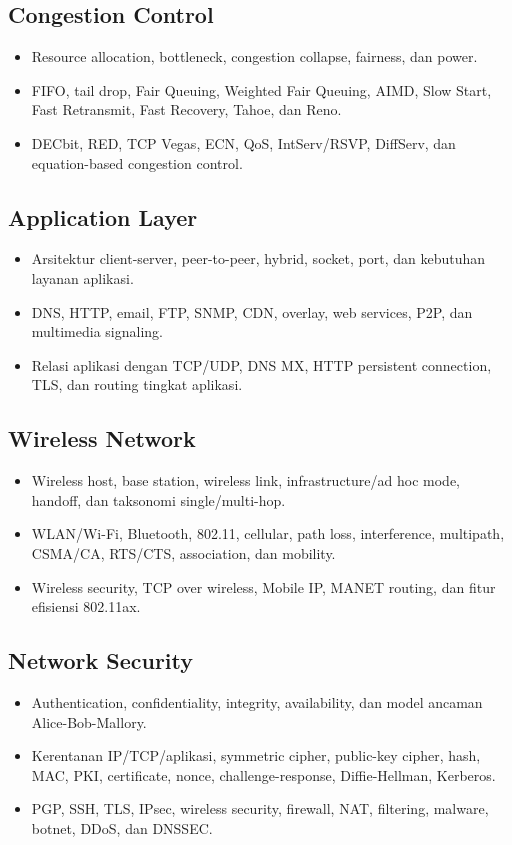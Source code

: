 \documentclass[11pt,a4paper]{article}
\begin{document}
\subsection{Congestion Control}
\begin{itemize}
    \item Resource allocation, bottleneck, congestion collapse, fairness, dan power.
    \item FIFO, tail drop, Fair Queuing, Weighted Fair Queuing, AIMD, Slow Start, Fast Retransmit, Fast Recovery, Tahoe, dan Reno.
    \item DECbit, RED, TCP Vegas, ECN, QoS, IntServ/RSVP, DiffServ, dan equation-based congestion control.
\end{itemize}

\subsection{Application Layer}
\begin{itemize}
    \item Arsitektur client-server, peer-to-peer, hybrid, socket, port, dan kebutuhan layanan aplikasi.
    \item DNS, HTTP, email, FTP, SNMP, CDN, overlay, web services, P2P, dan multimedia signaling.
    \item Relasi aplikasi dengan TCP/UDP, DNS MX, HTTP persistent connection, TLS, dan routing tingkat aplikasi.
\end{itemize}

\subsection{Wireless Network}
\begin{itemize}
    \item Wireless host, base station, wireless link, infrastructure/ad hoc mode, handoff, dan taksonomi single/multi-hop.
    \item WLAN/Wi-Fi, Bluetooth, 802.11, cellular, path loss, interference, multipath, CSMA/CA, RTS/CTS, association, dan mobility.
    \item Wireless security, TCP over wireless, Mobile IP, MANET routing, dan fitur efisiensi 802.11ax.
\end{itemize}

\subsection{Network Security}
\begin{itemize}
    \item Authentication, confidentiality, integrity, availability, dan model ancaman Alice-Bob-Mallory.
    \item Kerentanan IP/TCP/aplikasi, symmetric cipher, public-key cipher, hash, MAC, PKI, certificate, nonce, challenge-response, Diffie-Hellman, Kerberos.
    \item PGP, SSH, TLS, IPsec, wireless security, firewall, NAT, filtering, malware, botnet, DDoS, dan DNSSEC.
\end{itemize}

\newpage

\newpage

\newpage

\newpage

\newpage

\end{document}
